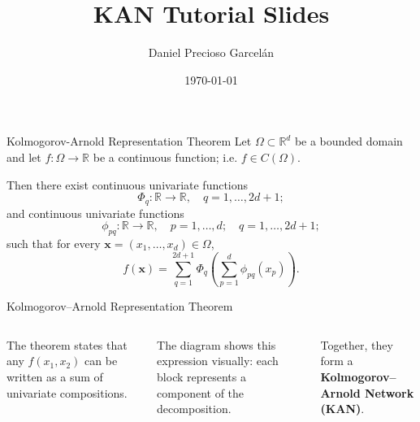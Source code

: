 \documentclass[aspectratio=169]{beamer}
\title{KAN Tutorial Slides}
\author{Daniel Precioso Garcelán}
\date{\today}
\begin{document}
\maketitle

\begin{frame}{Kolmogorov-Arnold Representation Theorem}
Let $ \Omega \subset \mathbb{R}^d $ be a bounded domain and let $ f: \Omega \rightarrow \mathbb{R} $ be a continuous function; i.e. $ f \in C(\Omega) $.

Then there exist continuous univariate functions
$$
\Phi_q: \mathbb{R} \to \mathbb{R}, \quad q = 1, \dots, 2d+1;
$$
and continuous univariate functions
$$
\phi_{pq}: \mathbb{R} \to \mathbb{R}, \quad p = 1, \dots, d; \quad q = 1, \dots, 2d+1;
$$
such that for every $\mathbf{x} = (x_1, \dots, x_d) \in \Omega$,
$$
f(\mathbf{x}) = \sum_{q=1}^{2d+1} \Phi_q \left( \sum_{p=1}^d \phi_{pq}(x_p) \right).
$$
\end{frame}


\begin{frame}{Kolmogorov–Arnold Representation Theorem}
	
	\begin{columns}[T,onlytextwidth]
		
		\centering
		\resizebox{\linewidth}{!}{}
		
		The theorem states that any $f(x_1, x_2)$ can be written as a sum of univariate compositions.
		
		\vspace{0.8em}
		The diagram shows this expression visually: each block represents a component of the decomposition.
		
		\vspace{0.8em}
		Together, they form a \textbf{Kolmogorov–Arnold Network (KAN)}.
		
	\end{columns}
	
\end{frame}

\end{document}
